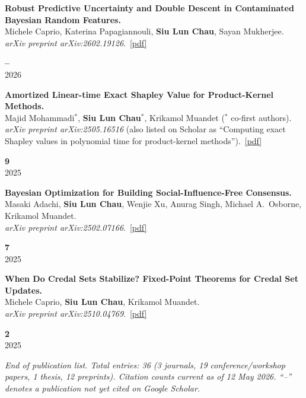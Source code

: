 \documentclass[11pt,a4paper]{article}
\newcommand{\me}{\textbf{Siu Lun Chau}}
\newcommand{\venueplain}[1]{\textit{#1}}
\newcommand{\pdfb}[1]{\,\href{#1}{\textcolor{accent}{\small[pdf]}}}
\newlength{\citecolwidth}\setlength{\citecolwidth}{2.4cm}
\newlength{\indexcolwidth}\setlength{\indexcolwidth}{3.2em}
\newcommand{\citebox}[2]{%
  {\color{citecol}\textbf{\large #1}}\\[1pt]
  {\color{mutedgrey}\small #2}%
}
\newcommand{\pubentry}[4]{%
  \noindent
  \makebox[\indexcolwidth][l]{\textbf{[#1]}}%
  \begin{minipage}[t]{\dimexpr\linewidth-\indexcolwidth-\citecolwidth-0.4em\relax}#2\end{minipage}%
  \hspace{0.4em}%
  \begin{minipage}[t]{\citecolwidth}\raggedleft\citebox{#3}{#4}\end{minipage}%
  \par\vspace{6pt}}
\begin{document}
\pubentry{P9}{%
\textbf{Robust Predictive Uncertainty and Double Descent in Contaminated Bayesian Random Features.}\\
Michele Caprio, Katerina Papagiannouli, \me, Sayan Mukherjee.\\
\venueplain{arXiv preprint arXiv:2602.19126}.%
\pdfb{https://arxiv.org/pdf/2602.19126}%
}{--}{2026}

\pubentry{P10}{%
\textbf{Amortized Linear-time Exact Shapley Value for Product-Kernel Methods.}\\
Majid Mohammadi$^{*}$, \me$^{*}$, Krikamol Muandet ($^{*}$ co-first authors).\\
\venueplain{arXiv preprint arXiv:2505.16516} (also listed on Scholar as ``Computing exact Shapley values in polynomial time for product-kernel methods'').%
\pdfb{https://arxiv.org/pdf/2505.16516}%
}{9}{2025}

\pubentry{P11}{%
\textbf{Bayesian Optimization for Building Social-Influence-Free Consensus.}\\
Masaki Adachi, \me, Wenjie Xu, Anurag Singh, Michael A.\ Osborne, Krikamol Muandet.\\
\venueplain{arXiv preprint arXiv:2502.07166}.%
\pdfb{https://arxiv.org/pdf/2502.07166}%
}{7}{2025}

\pubentry{P12}{%
\textbf{When Do Credal Sets Stabilize? Fixed-Point Theorems for Credal Set Updates.}\\
Michele Caprio, \me, Krikamol Muandet.\\
\venueplain{arXiv preprint arXiv:2510.04769}.%
\pdfb{https://arxiv.org/pdf/2510.04769}%
}{2}{2025}

\vspace{6pt}
\noindent\small\textit{End of publication list. Total entries: 36
(3 journals, 19 conference/workshop papers, 1 thesis, 12 preprints).
Citation counts current as of 12 May 2026. ``--'' denotes a publication not yet cited on Google Scholar.}
\end{document}

